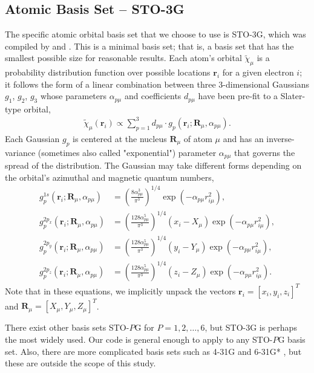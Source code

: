 \documentclass[12pt]{article}
\newcommand{\vect}[1]{\boldsymbol{#1}}
\begin{document}
\subsection{Atomic Basis Set -- STO-3G}    

The specific atomic orbital basis set that we choose to use is STO-3G, which was compiled by \cite{feller1996} and \cite{schuchardt2007}.  This is a minimal basis set; that is, a basis set that has the smallest possible size for reasonable results.  Each atom's orbital $\tilde{\chi}_\mu$ is a probability distribution function over possible locations $\vect{r}_i$ for a given electron $i$; it follows the form of a linear combination between three 3-dimensional Gaussians $g_1$, $g_2$, $g_3$ whose parameters $\alpha_{p \mu}$ and coefficients $d_{p \mu}$ have been pre-fit to a Slater-type orbital, 
\begin{align}
\tilde{\chi}_\mu(\vect{r}_i) \propto \sum_{p=1}^3 d_{p \mu} \cdot g_p(\vect{r}_i; \vect{R}_\mu, \alpha_{p \mu}). 
\end{align}       
Each Gaussian $g_p$ is centered at the nucleus $\vect{R}_\mu$ of atom $\mu$ and has an inverse-variance (sometimes also called "exponential") parameter $\alpha_{p \mu}$ that governs the spread of the distribution.  The Gaussian may take different forms depending on the orbital's azimuthal and magnetic quantum numbers, 
\begin{align}
g_p^{1s}(\vect{r}_i; \vect{R}_\mu, \alpha_{p \mu}) &= \left(\frac{8 \alpha_{p \mu}^3}{\pi^3}\right)^{1/4}  \exp(-\alpha_{p \mu} r_{i \mu}^2), \\
g_p^{2p_x}(\vect{r}_i; \vect{R}_\mu, \alpha_{p \mu}) &= \left(\frac{128 \alpha_{p \mu}^5}{\pi^3}\right)^{1/4}  (x_i - X_\mu) \exp(-\alpha_{p \mu} r_{i \mu}^2), \\
g_p^{2p_y}(\vect{r}_i; \vect{R}_\mu, \alpha_{p \mu}) &= \left(\frac{128 \alpha_{p \mu}^5}{\pi^3}\right)^{1/4}  (y_i - Y_\mu) \exp(-\alpha_{p \mu} r_{i \mu}^2), \\
g_p^{2p_z}(\vect{r}_i; \vect{R}_\mu, \alpha_{p \mu}) &= \left(\frac{128 \alpha_{p \mu}^5}{\pi^3}\right)^{1/4}  (z_i - Z_\mu) \exp(-\alpha_{p \mu} r_{i \mu}^2).
\end{align}
Note that in these equations, we implicitly unpack the vectors $\vect{r}_i = [x_i, y_i, z_i]^T$ and $\vect{R}_\mu = [X_\mu, Y_\mu, Z_\mu]^T$.  

There exist other basis sets STO-$P$G for $P = 1, 2, \ldots, 6$, but STO-3G is perhaps the most widely used.  Our code is general enough to apply to any STO-$P$G basis set. Also, there are more complicated basis sets such as 4-31G and 6-31G* \cite{schuchardt2007}, but these are outside the scope of this study.
\end{document}
